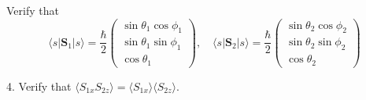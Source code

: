 Verify that
\begin{equation*}
\langle s|\mathbf S_1|s\rangle
=\frac{\hbar}{2}\begin{pmatrix}
\sin\theta_1\cos\phi_1\\
\sin\theta_1\sin\phi_1\\
\cos\theta_1
\end{pmatrix},\quad
\langle s|\mathbf S_2|s\rangle
=\frac{\hbar}{2}\begin{pmatrix}
\sin\theta_2\cos\phi_2\\
\sin\theta_2\sin\phi_2\\
\cos\theta_2
\end{pmatrix}
\end{equation*}

4. Verify that $\langle S_{1x}S_{2z}\rangle=\langle S_{1x}\rangle\langle S_{2z}\rangle$.



